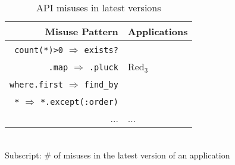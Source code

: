 \begin{table}
\caption{API misuses in latest versions}
\label{tab:badapi}
{
\begin{tabular}{rl}
\toprule
Misuse Pattern & Applications\\
\midrule
\texttt{count(*)>0} $\Rightarrow$ \texttt{exists?} &\\
\texttt{.map} $\Rightarrow$ \texttt{.pluck} & Red$_3$\\
\texttt{where.first} $\Rightarrow$ \texttt{find\_by} & \\
\texttt{*} $\Rightarrow$ \texttt{*.except(:order)} & \\
... & ...\\
\bottomrule
\end{tabular}
}
{\footnotesize \\ Subscript: \# of misuses in the latest version of an application \par}
\end{table}